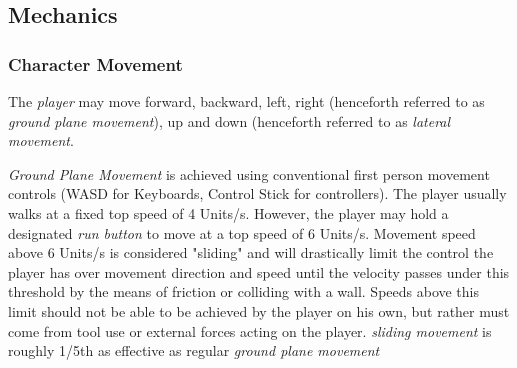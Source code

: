 \documentclass[10pt,a4paper]{article}
\begin{document}
\subsection{Mechanics}
\subsubsection{Character Movement}
\label{Character Movement}
The \emph{player} may move forward, backward, left, right (henceforth referred to as \emph{ground plane movement}), up and down (henceforth referred to as \emph{lateral movement}.

\emph{Ground Plane Movement} is achieved using conventional first person movement controls (WASD for Keyboards, Control Stick for controllers). The player usually walks at a fixed  top speed of 4 Units/s. However, the player may hold a designated \emph{run button} to move at a top speed of 6 Units/s. Movement speed above 6 Units/s is considered "sliding" and will drastically limit the control the player has over movement direction and speed until the velocity passes under this threshold by the means of friction or colliding with a wall. Speeds above this limit should not be able to be achieved by the player on his own, but rather must come from tool use or external forces acting on the player. \emph{sliding movement} is roughly 1/5th as effective as regular \emph{ground plane movement}
\end{document}
